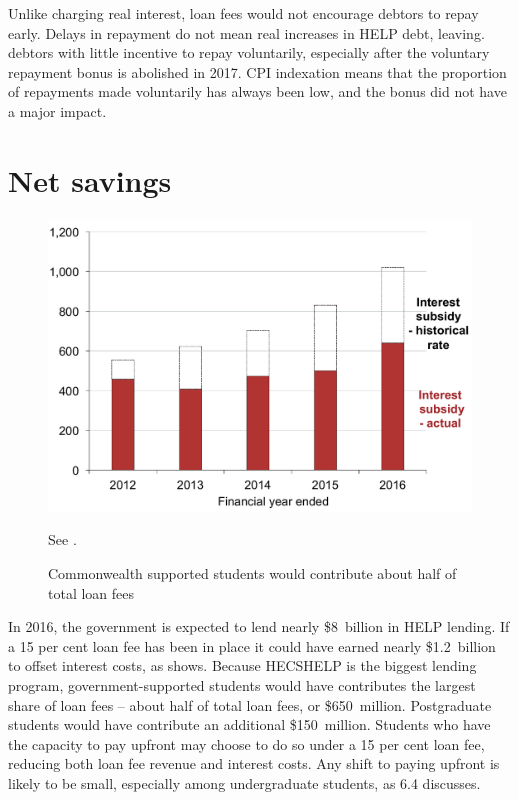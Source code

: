 \documentclass[embargoed]{grattan}
\begin{document}
Unlike charging real interest, loan fees would not encourage debtors to repay early.
Delays in repayment do not mean real increases in \gls{HELP} debt, leaving. debtors with little incentive to repay voluntarily, especially after the voluntary repayment bonus is abolished in 2017.
\gls{CPI} indexation means that the proportion of repayments made voluntarily has always been low, and the bonus did not have a major impact.

\section{Net savings}\label{net-savings}

\begin{figure}
\caption{Commonwealth supported students would contribute about half of total loan fees}\label{fig:fig23-Cth-supported-students-would-contr-half-tot-loan-fees}


\includegraphics[page=23]{atlas/Chartpack.pdf}

{See .}
\end{figure}

In 2016, the government is expected to lend nearly \$8~billion in \gls{HELP} lending.
If a 15 per cent loan fee has been in place it could have earned nearly \$1.2~billion to offset interest costs, as  shows.
Because \gls{HECSHELP} is the biggest lending program, government-supported students would have contributes the largest share of loan fees -- about half of total loan fees, or \$650~million.
Postgraduate students would have contribute an additional \$150~million.
Students who have the capacity to pay upfront may choose to do so under a 15 per cent loan fee, reducing both loan fee revenue and interest costs.
Any shift to paying upfront is likely to be small, especially among undergraduate students, as 6.4 discusses.
\end{document}
